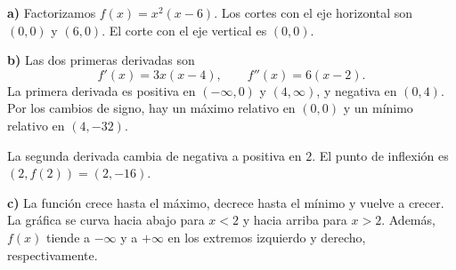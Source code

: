 \textbf{a)} Factorizamos $f(x)=x^2(x-6)$. Los cortes con el eje horizontal son $(0,0)$ y $(6,0)$. El corte con el eje vertical es $(0,0)$.

\textbf{b)} Las dos primeras derivadas son
\[
 f'(x)=3x(x-4),\qquad f''(x)=6(x-2).
\]
La primera derivada es positiva en $(-\infty,0)$ y $(4,\infty)$, y negativa en $(0,4)$. Por los cambios de signo, hay un máximo relativo en $(0,0)$ y un mínimo relativo en $(4,-32)$.

La segunda derivada cambia de negativa a positiva en $2$. El punto de inflexión es $(2,f(2))=\boxed{(2,-16)}$.

\textbf{c)} La función crece hasta el máximo, decrece hasta el mínimo y vuelve a crecer. La gráfica se curva hacia abajo para $x<2$ y hacia arriba para $x>2$. Además, $f(x)$ tiende a $-\infty$ y a $+\infty$ en los extremos izquierdo y derecho, respectivamente.
